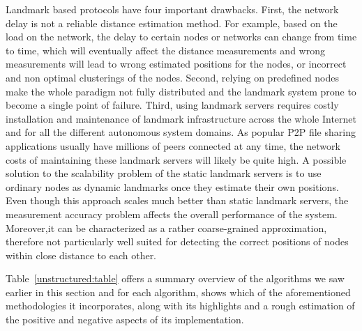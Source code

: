 Landmark based protocols have four important drawbacks. First, the network
delay is not a reliable distance estimation method. For example, based on the
load on the network, the delay to certain nodes or networks can change from time
to time, which will eventually affect the distance measurements and wrong
measurements will lead to wrong estimated positions for the nodes, or incorrect
and non optimal clusterings of the nodes. Second, relying on predefined nodes
make the whole paradigm not fully distributed and the landmark system prone to
become a single point of failure. Third, using
landmark servers requires costly installation and maintenance of landmark
infrastructure across the whole Internet and for all the different autonomous
system domains. As popular P2P file sharing applications usually have millions
of peers connected at any time, the network costs
of maintaining these landmark servers will likely be quite high. A possible solution to
the scalability problem of the static landmark servers is to use ordinary nodes
as dynamic landmarks once they estimate their own positions. Even though this
approach scales much better than static landmark servers, the measurement
accuracy problem affects the overall performance of the system. Moreover,it can
be characterized as a rather coarse-grained approximation, therefore not
particularly well suited for detecting the correct positions of nodes within
close distance to each other.

Table~\ref{unstructured:table} offers a summary overview of the algorithms
we saw earlier in this section and for each algorithm, shows which of the
aforementioned methodologies it incorporates, along with its 
highlights and a rough estimation of the
positive and negative aspects of its implementation.





